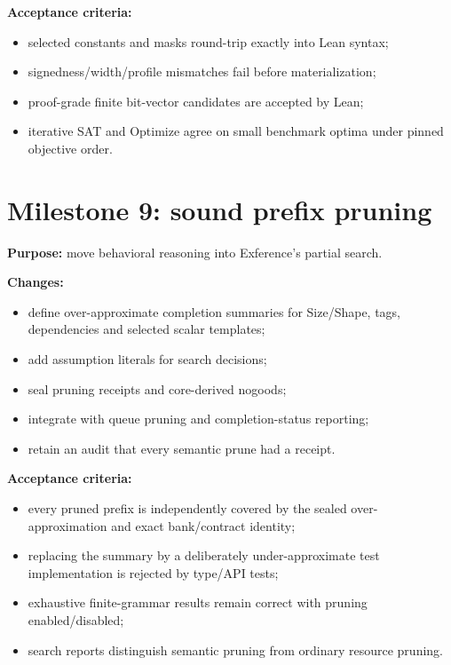 \documentclass[11pt,oneside]{report}
\begin{document}
\textbf{Acceptance criteria:}

\begin{itemize}[leftmargin=2em]
\item selected constants and masks round-trip exactly into Lean syntax;
\item signedness/width/profile mismatches fail before materialization;
\item proof-grade finite bit-vector candidates are accepted by Lean;
\item iterative SAT and Optimize agree on small benchmark optima under pinned objective order.
\end{itemize}

\section{Milestone 9: sound prefix pruning}

\textbf{Purpose:} move behavioral reasoning into Exference's partial search.

\textbf{Changes:}

\begin{itemize}[leftmargin=2em]
\item define over-approximate completion summaries for Size/Shape, tags, dependencies and selected scalar templates;
\item add assumption literals for search decisions;
\item seal pruning receipts and core-derived nogoods;
\item integrate with queue pruning and completion-status reporting;
\item retain an audit that every semantic prune had a receipt.
\end{itemize}

\textbf{Acceptance criteria:}

\begin{itemize}[leftmargin=2em]
\item every pruned prefix is independently covered by the sealed over-approximation and exact bank/contract identity;
\item replacing the summary by a deliberately under-approximate test implementation is rejected by type/API tests;
\item exhaustive finite-grammar results remain correct with pruning enabled/disabled;
\item search reports distinguish semantic pruning from ordinary resource pruning.
\end{itemize}
\end{document}
